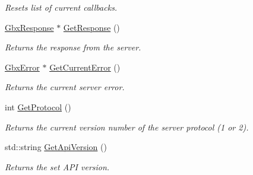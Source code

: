 \begin{DoxyCompactItemize}
\begin{DoxyCompactList}\small\item\em Resets list of current callbacks. \end{DoxyCompactList}\item 
\hypertarget{classGbxRemote_adac67444e391ffcc1dfda8f087eaef0b}{\hyperlink{classGbxResponse}{Gbx\-Response} $\ast$ \hyperlink{classGbxRemote_adac67444e391ffcc1dfda8f087eaef0b}{Get\-Response} ()}\label{classGbxRemote_adac67444e391ffcc1dfda8f087eaef0b}

\begin{DoxyCompactList}\small\item\em Returns the response from the server. \end{DoxyCompactList}\item 
\hyperlink{structGbxError}{Gbx\-Error} $\ast$ \hyperlink{classGbxRemote_a5467b5400129cd13239f88576aaaa2b4}{Get\-Current\-Error} ()
\begin{DoxyCompactList}\small\item\em Returns the current server error. \end{DoxyCompactList}\item 
\hypertarget{classGbxRemote_ae6e15060920a31482fd14045cfd42803}{int \hyperlink{classGbxRemote_ae6e15060920a31482fd14045cfd42803}{Get\-Protocol} ()}\label{classGbxRemote_ae6e15060920a31482fd14045cfd42803}

\begin{DoxyCompactList}\small\item\em Returns the current version number of the server protocol (1 or 2). \end{DoxyCompactList}\item 
\hypertarget{classGbxRemote_a6351f71fe649bff2aabfbd9b7c89e3f5}{std\-::string \hyperlink{classGbxRemote_a6351f71fe649bff2aabfbd9b7c89e3f5}{Get\-Api\-Version} ()}\label{classGbxRemote_a6351f71fe649bff2aabfbd9b7c89e3f5}

\begin{DoxyCompactList}\small\item\em Returns the set A\-P\-I version. \end{DoxyCompactList}\end{DoxyCompactItemize}
